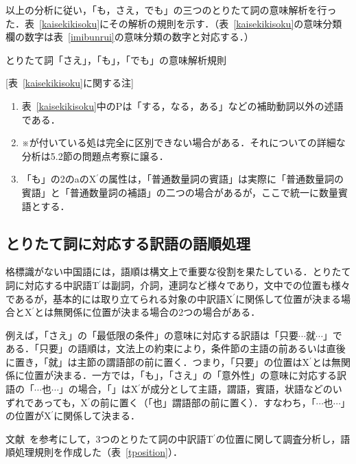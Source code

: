以上の分析に従い，「も，さえ，でも」の三つのとりたて詞の意味解析を行った．表~\ref{kaisekikisoku}にその解析の規則を示す．（表~\ref{kaisekikisoku}の意味分類欄の数字は表~\ref{imibunrui}の意味分類の数字と対応する．）

\begin{table}[pt]
\begin{center}
\vspace*{-2em}
\caption{とりたて詞「さえ」，「も」，「でも」の意味解析規則}
\label{kaisekikisoku}
\end{center}
{\footnotesize
[表~\ref{kaisekikisoku}に関する注]
\renewcommand{\labelenumi}{}
\begin{enumerate}
 \setlength{\labelwidth}{15pt}
 \item 表~\ref{kaisekikisoku}中のPは「する，なる，ある」などの補助動詞以外の述語である．
 \item ※が付いている処は完全に区別できない場合がある．それについての詳細な分析は5.2節の問題点考察に譲る．
 \item 「も」の2のaのX$^{\prime}$の属性は，「普通数量詞の賓語」は実際に「普通数量詞の賓語」と「普通数量詞の補語」の二つの場合があるが，ここで統一に数量賓語とする．
\end{enumerate}
}
\end{table}
\renewcommand{\labelenumi}{}

\subsection{とりたて詞に対応する訳語の語順処理}
格標識がない中国語には，語順は構文上で重要な役割を果たしている．とりたて詞に対応する中訳語T$^{\prime}$は副詞，介詞，連詞など様々であり，文中での位置も様々であるが，基本的には取り立てられる対象の中訳語X$^{\prime}$に関係して位置が決まる場合とX$^{\prime}$とは無関係に位置が決まる場合の2つの場合がある．

例えば，「さえ」の「最低限の条件」の意味に対応する訳語は「只要$\cdots$就$\cdots$」である．「只要」の語順は，文法上の約束により，条件節の主語の前あるいは直後に置き，「就」は主節の謂語部の前に置く．つまり，「只要」の位置はX$^{\prime}$とは無関係に位置が決まる．一方では，「も」，「さえ」の「意外性」の意味に対応する訳語の「$\cdots$也$\cdots$」の場合，「」はX$^{\prime}$が成分として主語，謂語，賓語，状語などのいずれであっても，X$^{\prime}$の前に置く（「也」謂語部の前に置く）．すなわち，「$\cdots$也$\cdots$」の位置がX$^{\prime}$に関係して決まる．

文献~\cite{lu80,yu98}を参考にして，3つのとりたて詞の中訳語T$^{\prime}$の位置に関して調査分析し，語順処理規則を作成した（表~\ref{tposition}）．


